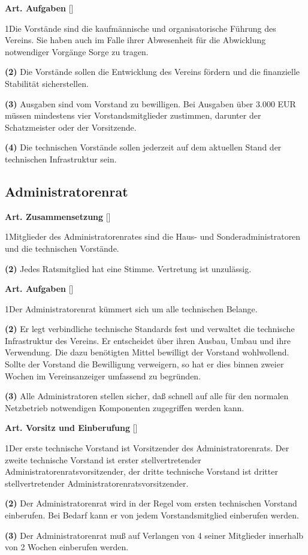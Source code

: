 \documentclass[12pt]{article}
\newcommand{\UAbschnitt}[1]{\subsection{#1}}
\newcommand{\Satz}[2]{

\begin{samepage}
{\bf (#1)} #2
\end{samepage}
}
\newenvironment{Artikel}[2]{
\bigskip \centerline{{\bf Art. #1} [#2]}
\nopagebreak
}{
}
\begin{document}
\begin{Artikel}{24}{Aufgaben}

\Satz{1}{Die Vorstände sind die kaufmännische und organisatorische 
Führung des Vereins. Sie haben auch im Falle ihrer Abwesenheit für die 
Abwicklung notwendiger Vorgänge Sorge zu tragen.}

\Satz{2}{Die Vorstände sollen die Entwicklung des Vereins fördern und die
finanzielle Stabilität sicherstellen.}

\Satz{3}{Ausgaben sind vom Vorstand zu bewilligen. Bei Ausgaben über 3.000 EUR
müssen mindestens vier Vorstandsmitglieder zustimmen, darunter der
Schatzmeister oder der Vorsitzende.}

\Satz{4}{Die technischen Vorstände sollen jederzeit auf dem aktuellen Stand der
technischen Infrastruktur sein.}

\end{Artikel}

\UAbschnitt{Administratorenrat}

\begin{Artikel}{25}{Zusammensetzung}

\Satz{1}{Mitglieder des Administratorenrates sind die Haus- und
Sonderadministratoren und die technischen Vorstände.}

\Satz{2}{Jedes Ratsmitglied hat eine Stimme. Vertretung ist unzulässig.}

\end{Artikel}

\begin{Artikel}{26}{Aufgaben}

\Satz{1}{Der Administratorenrat kümmert sich um alle technischen Belange.}

\Satz{2}{Er legt verbindliche technische Standards fest und verwaltet die
technische Infrastruktur des Vereins. Er entscheidet über ihren Ausbau, Umbau
und ihre Verwendung. Die dazu benötigten Mittel bewilligt der Vorstand
wohlwollend. Sollte der Vorstand die Bewilligung verweigern, so hat er dies
binnen zweier Wochen im Vereinsanzeiger umfassend zu begründen.}

\Satz{3}{Alle Administratoren stellen sicher, daß schnell auf alle für den
normalen Netzbetrieb notwendigen Komponenten zugegriffen werden kann.}

\end{Artikel}

\begin{Artikel}{27}{Vorsitz und Einberufung}

\Satz{1}{Der erste technische Vorstand ist Vorsitzender des
Administratorenrats. Der zweite technische Vorstand ist erster
stellvertretender Administratorenratsvorsitzender, der dritte technische
Vorstand ist dritter stellvertretender Administratorenratsvorsitzender.}

\Satz{2}{Der Administratorenrat wird in der Regel vom ersten technischen
Vorstand einberufen. Bei Bedarf kann er von jedem Vorstandsmitglied
einberufen werden.}

\Satz{3}{Der Administratorenrat muß auf Verlangen von 4 seiner Mitglieder
innerhalb von 2 Wochen einberufen werden.}

\end{Artikel}
\end{document}
